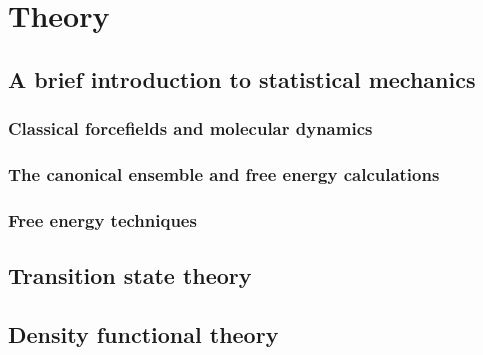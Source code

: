 \chapter{Theory}

\section{A brief introduction to statistical mechanics}

\subsection{Classical forcefields and molecular dynamics}

\subsection{The canonical ensemble and free energy calculations}

\subsection{Free energy techniques}



\section{Transition state theory}



\section{Density functional theory}

